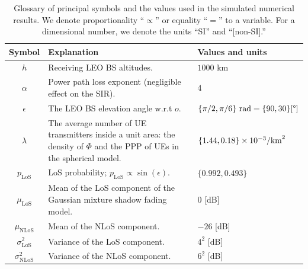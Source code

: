 \documentclass[lettersize,journal]{IEEEtran}
\newcommand{\rEarth}{R_{\oplus}}
\newcommand{\R}{\mathbb{R}}
\begin{document}
\begin{table}
   \captionsetup{size=footnotesize}
   \caption{Glossary of principal symbols and the values used in the simulated numerical results. We denote proportionality ``$\propto$'' or equality ``$=$'' to a variable. For a dimensional number, we denote the units ``SI'' and ``[non-SI].''}
     \label{table:parameters}
     \begin{center}
    \begin{tabular}{c|p{4.5cm}|p{1.9cm}}
      \toprule
      Symbol& Explanation &Values and units
      \\ 
      \hline 
      $h$ & Receiving LEO BS altitudes. &$1000$ km  \\
      $\alpha$ &Power path loss exponent (negligible effect on the SIR).& $4$\\
      $\epsilon$& The LEO BS elevation angle w.r.t $\textit{o}$.&$\{{\pi}/{2},{\pi}/{6}\}\text{ rad}\break=\{90,30\}[\degree]$\\
      $\lambda$ & The average number of UE transmitters inside a unit area: the density of $\Phi$ and the PPP of UEs in the spherical model. &$\{1.44,0.18\} \times\break 10^{-3}\text{/km}^2$\\
      $p_{\text{LoS}}$& LoS probability; $p_{\text{LoS}} \propto \sin(\epsilon)$. & $\{0.992,0.493\}$\\
      $\mu_{\text{LoS}}$& Mean of the LoS component of the Gaussian mixture shadow fading model. & $0$ [dB] \\
      $\mu_{\text{NLoS}}$& Mean of the NLoS component. & $-26$ [dB] \\
      $\sigma^2_{\text{LoS}}$& Variance of the LoS component. & $4^2$ [dB] \\
      $\sigma^2_{\text{NLoS}}$& Variance of the NLoS component. & $6^2$ [dB] \\

\end{tabular}
\end{center}
\end{table}
\end{document}
